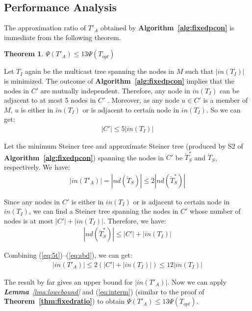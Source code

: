 \documentclass[10pt, conference, compsocconf]{IEEEtran}
\newtheorem{theorem}{\textbf{Theorem}}
\begin{document}
  \subsection{Performance Analysis}
The approximation ratio of $T'_A$ obtained by \textbf{Algorithm~\ref{alg:fixedpcon}} is immediate from the following theorem.
\begin{theorem}
      $\Psi(T'_A)\leq 13\Psi(T_\mathit{opt})$
      \label{thm:distributed}
    \end{theorem}
\begin{IEEEproof}
Let $T_I$ again be the multicast tree spanning the nodes in $M$ such that $|\mathit{in}(T_I)|$ is minimized. The outcome of \textbf{Algorithm~\ref{alg:fixedpcon}} implies that the nodes in $C'$ are mutually independent. Therefore, any node in $\mathit{in}(T_I)$ can be adjacent to at most 5 nodes in $C'$ \cite{Wan2002}. Moreover, as any node $u \in C'$ is a member of $M$, $u$ is either in $\mathit{in}(T_I)$ or is adjacent to certain node in $\mathit{in}(T_I)$. So we can get:
\begin{eqnarray}
        |C'|\le 5|\mathit{in}(T_I)| \label{eq:5t}
      \end{eqnarray}

      Let the minimum Steiner tree and approximate Steiner tree (produced by S2 of \textbf{Algorithm~\ref{alg:fixedpcon}}) spanning the nodes in $C'$ be $\acute{T}^*_S$ and $\acute{T}_S$, respectively. We have:
\begin{eqnarray}
        |\mathit{in}(T'_A)| = |\mathit{nd}(\acute{T}_S)| \le 2|\mathit{nd}(\acute{T}^*_S)|
      \end{eqnarray}

      Since any nodes in $C'$ is either in $\mathit{in}(T_I)$ or is adjacent to certain node in $in(T_I)$, we can find a Steiner tree spanning the nodes in $C'$ whose number of nodes is at most $|C'|+|\mathit{in}(T_I)|$. Therefore, we have:
\begin{eqnarray}
        |\mathit{nd}(\acute{T}^*_S)|\le |C'|+|\mathit{in}(T_I)| \label{eq:sbd}
      \end{eqnarray}

      Combining (\ref{eq:5t})--(\ref{eq:sbd}), we can get:
\begin{eqnarray}
        |\mathit{in}(T'_A)|\le 2(|C'|+|\mathit{in}(T_I)|) \le 12|\mathit{in}(T_I)|
      \end{eqnarray}

      The result by far gives an upper bound for $|\mathit{in}(T'_A)|$. Now we can apply \textit{\textbf{Lemma}~\ref{lma:lowebound}} and (\ref{eq:interm}) (similar to the proof of \textbf{Theorem~\ref{thm:fixedratio}}) to obtain $\Psi(T'_A)\leq 13\Psi(T_\mathit{opt})$.
    \end{IEEEproof}
\end{document}
